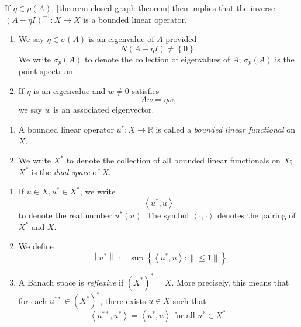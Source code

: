 If \( \eta \in \rho(A) \), \ref{theorem-closed-graph-theorem} then implies that the inverse \( (A - \eta I)^{-1}: X \to X \) is a bounded linear operator.

\begin{definition}
  \begin{enumerate}
    \item We say \( \eta \in \sigma(A) \) is an eigenvalue of \( A \) provided
          \[
            N(A - \eta I) \neq \left\lbrace 0 \right\rbrace.
          \]
          We write \( \sigma_p(A) \) to denote the collection of eigenvalues of \( A \);
          \( \sigma_p(A) \) is the point spectrum.
    \item If \( \eta \) is an eigenvalue and \( w \neq 0 \) satisfies
          \[
            A w = \eta w,
          \]
          we say \( w \) is an associated eigenvector.
  \end{enumerate}
\end{definition}

\begin{definition}
  \label{definition-bounded-linear-functional}
  \label{definition-dual-space}
  \begin{enumerate}
    \item A bounded linear operator \( u^*: X \to \mathbb{R} \) is called a \emph{bounded linear functional} on \( X \).
    \item We write \( X^* \) to denote the collection of all bounded linear functionals on \( X \); \( X^* \) is the \emph{dual space} of \( X \).
  \end{enumerate}
\end{definition}

\begin{definition}
  \label{definition-pairing}
  \label{definition-reflexive-Banach-space}
  \begin{enumerate}
    \item If \( u \in X, u^* \in X^* \), we write
          \[
            \left\langle u^*, u \right\rangle
          \]
          to denote the real number \( u^*(u) \).
          The symbol \( \left\langle \cdot, \cdot \right\rangle \) denotes the pairing of \( X^* \) and \( X \).
    \item We define
          \[
            \left\lVert u^* \right\rVert := \sup \left\lbrace \left\langle u^*, u \right\rangle: \left\lVert \leq 1 \right\rVert \right\rbrace
          \]
    \item A Banach space is \emph{reflexive} if \( (X^*)^* = X \).
          More precisely, this means that for each \( u^{**} \in (X^*)^* \), there exists \( u \in X \) such that
          \[
            \left\langle u^{**}, u^* \right\rangle = \left\langle u^*, u \right\rangle \text{ for all } u^* \in X^*.
          \]
  \end{enumerate}
\end{definition}

